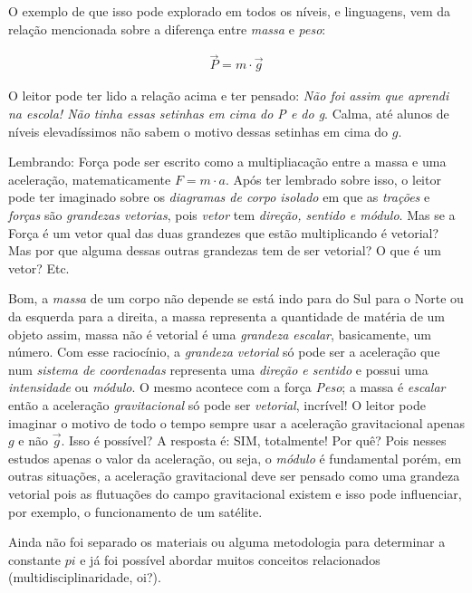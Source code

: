 O exemplo de que isso pode explorado em todos os níveis, e linguagens, vem da relação mencionada sobre a diferença entre \textit{massa} e \textit{peso}:

\begin{ceqn}
	\begin{align*}
		\vec{P} = m \cdot \vec{g}
	\end{align*}
\end{ceqn}
	
	
O leitor pode ter lido a relação acima e ter pensado: \textit{Não foi assim que aprendi na escola! Não tinha essas setinhas em cima do P e do g}. Calma, até alunos de níveis elevadíssimos não sabem o motivo dessas setinhas em cima do $g$.

Lembrando: Força pode ser escrito como a multipliacação entre a massa e uma aceleração, matematicamente $F=m \cdot a$. Após ter lembrado sobre isso, o leitor pode ter imaginado sobre os \textit{diagramas de corpo isolado} em que as \textit{trações} e \textit{forças} são \textit{grandezas vetorias}, pois \textit{vetor} tem \textit{direção, sentido e módulo}. Mas se a Força é um vetor qual das duas grandezes que estão multiplicando é vetorial? Mas por que alguma dessas outras grandezas tem de ser vetorial? O que é um vetor? Etc.

Bom, a \textit{massa} de um corpo não depende se está indo para do Sul para o Norte ou da esquerda para a direita, a massa representa a quantidade de matéria de um objeto assim, massa não é vetorial é uma \textit{grandeza escalar}, basicamente, um número. Com esse raciocínio, a \textit{grandeza vetorial} só pode ser a aceleração que num \textit{sistema de coordenadas} representa uma \textit{direção e sentido} e possui uma \textit{intensidade} ou \textit{módulo}. O mesmo acontece com a força \textit{Peso}; a massa é \textit{escalar} então a aceleração \textit{gravitacional} só pode ser \textit{vetorial}, incrível! O leitor pode imaginar o motivo de todo o tempo sempre usar a aceleração gravitacional apenas $g$ e não $\vec{g}$. Isso é possível? A resposta é: SIM, totalmente! Por quê? Pois nesses estudos apenas o valor da aceleração, ou seja, o \textit{módulo} é fundamental porém, em outras situações, a aceleração gravitacional deve ser pensado como uma grandeza vetorial pois as flutuações do campo gravitacional existem e isso pode influenciar, por exemplo, o funcionamento de um satélite.

Ainda não foi separado os materiais ou alguma metodologia para determinar a constante $pi$ e já foi possível abordar muitos conceitos relacionados (multidisciplinaridade, oi?).

